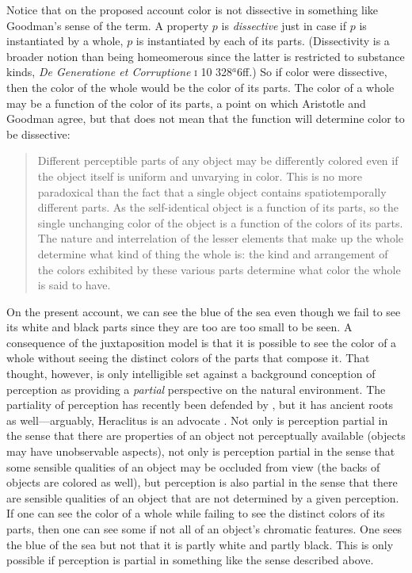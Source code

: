 Notice that on the proposed account color is not dissective in something like Goodman's \citeyearpar[53]{Goodman:1951ww} sense of the term. A property \( p \) is \emph{dissective} just in case if \( p \) is instantiated by a whole, \( p \) is instantiated by each of its parts. (Dissectivity is a broader notion than being homeomerous since the latter is restricted to substance kinds, \emph{De Generatione et Corruptione} \textsc{i} 10 328\( ^{a} \)6ff.) So if color were dissective, then the color of the whole would be the color of its parts. The color of a whole may be a function of the color of its parts, a point on which Aristotle and Goodman agree, but that does not mean that the function will determine color to be dissective:
\begin{quote}
	Different perceptible parts of any object may be differently colored even if the object itself is uniform and unvarying in color. This is no more paradoxical than the fact that a single object contains spatiotemporally different parts. As the self-identical object is a function of its parts, so the single unchanging color of the object is a function of the colors of its parts. The nature and interrelation of the lesser elements that make up the whole determine what kind of thing the whole is: the kind and arrangement of the colors exhibited by these various parts determine what color the whole is said to have. \citep[130]{Goodman:1951ww}
\end{quote}

On the present account, we can see the blue of the sea even though we fail to see its white and black parts since they are too are too small to be seen. A consequence of the juxtaposition model is that it is possible to see the color of a whole without seeing the distinct colors of the parts that compose it. That thought, however, is only intelligible set against a background conception of perception as providing a \emph{partial} perspective on the natural environment. The partiality of perception has recently been defended by \citet{Hilbert:1987jq}, but it has ancient roots as well---arguably, Heraclitus is an advocate \citep[see][]{Burnyeat:1979mv,Kalderon:2006tg}. Not only is perception partial in the sense that there are properties of an object not perceptually available (objects may have unobservable aspects), not only is perception partial in the sense that some sensible qualities of an object may be occluded from view (the backs of objects are colored as well), but perception is also partial in the sense that there are sensible qualities of an object that are not determined by a given perception. If one can see the color of a whole while failing to see the distinct colors of its parts, then one can see some if not all of an object's chromatic features. One sees the blue of the sea but not that it is partly white and partly black. This is only possible if perception is partial in something like the sense described above.

